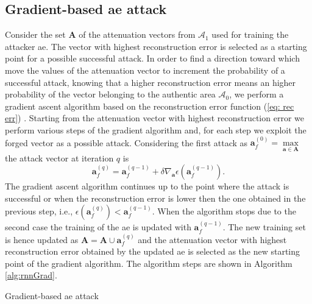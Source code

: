 \documentclass[draftcls,onecolumn,12pt]{IEEEtran}
\begin{document}
\subsection{Gradient-based \ac{ae} attack}
Consider the set $\bm{A}$ of the attenuation vectors from $\mathcal{A}_1$ used for training the attacker \ac{ae}. The vector with highest reconstruction error is selected as a starting point for a possible successful attack. In order to find a direction toward which move the values of the attenuation vector to increment the probability of a successful attack, knowing that a higher reconstruction error means an higher probability of the vector belonging to the authentic area $\mathcal{A}_0$, we perform a gradient ascent algorithm based on the reconstruction error function (\ref{eq: rec err}) . 
Starting from the attenuation vector with highest reconstruction error we perform various steps of the gradient algorithm and, for each step we exploit the forged vector as a possible attack. Considering the first attack as $\bm{a}_f^{(0)}=\underset{\bm{a} \in \bm{A}}{\max}$ the attack vector at iteration $q$ is
\begin{equation}\label{eq: rnn attack}
    \bm{a}_f^{(q)} = \bm{a}_f^{(q-1)}+ \delta \nabla_{\mathbf{a}}\epsilon(\bm{a}_f^{(q-1)}).
\end{equation}
The gradient ascent algorithm continues up to the point where the attack is successful or when the reconstruction error is lower then the one obtained in the previous step, i.e., $\epsilon(\bm{a}_f^{(q)}) < \bm{a}_f^{(q-1)}$. When the algorithm stops due to the second case the training of the \ac{ae} is updated with $\bm{a}_f^{(q-1)}$. The new training set is hence updated as $\bm{A} = \bm{A} \cup \bm{a}_f^{(q)}$ and the attenuation vector with highest reconstruction error obtained by the updated \ac{ae} is selected as the new starting point of the gradient algorithm. The algorithm steps are shown in Algorithm \ref{alg:rnnGrad}.

\begin{algorithm}[t]
\label{alg:rnnGrad}
  \scriptsize

 

    
 \caption{Gradient-based \ac{ae} attack}
\end{algorithm}
\end{document}
